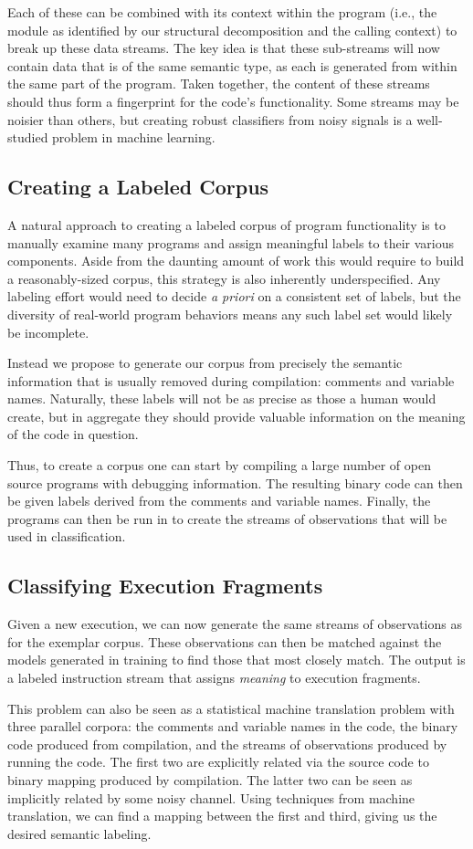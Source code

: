 Each of these can be combined with its context within the program (i.e.,
the module as identified by our structural decomposition and the calling
context) to break up these data streams. The key idea is that these
sub-streams will now contain data that is of the same semantic type, as
each is generated from within the same part of the program. Taken
together, the content of these streams should thus form a fingerprint
for the code's functionality. Some streams may be noisier than others,
but creating robust classifiers from noisy signals is a well-studied
problem in machine learning.

\subsection{Creating a Labeled Corpus}

A natural approach to creating a labeled corpus of program functionality
is to manually examine many programs and assign meaningful labels to
their various components. Aside from the daunting amount of work this
would require to build a reasonably-sized corpus, this strategy is also
inherently underspecified. Any labeling effort would need to decide
\emph{a priori} on a consistent set of labels, but the diversity of
real-world program behaviors means any such label set would likely be
incomplete.

Instead we propose to generate our corpus from precisely the semantic
information that is usually removed during compilation: comments and
variable names. Naturally, these labels will not be as precise as those
a human would create, but in aggregate they should provide valuable
information on the meaning of the code in question.

Thus, to create a corpus one can start by compiling a large number of
open source programs with debugging information. The resulting binary
code can then be given labels derived from the comments and variable
names. Finally, the programs can then be run in \dynamicsys to create
the streams of observations that will be used in classification.

\subsection{Classifying Execution Fragments}

Given a new execution, we can now generate the same streams of
observations as for the exemplar corpus. These observations can then be
matched against the models generated in training to find those that most
closely match. The output is a labeled instruction stream that assigns
\emph{meaning} to execution fragments.

This problem can also be seen as a statistical machine translation
problem with three parallel corpora: the comments and variable names in
the code, the binary code produced from compilation, and the streams of
observations produced by running the code. The first two are explicitly
related via the source code to binary mapping produced by compilation.
The latter two can be seen as implicitly related by some noisy channel. 
Using techniques from machine translation, we can find a mapping between
the first and third, giving us the desired semantic labeling.

